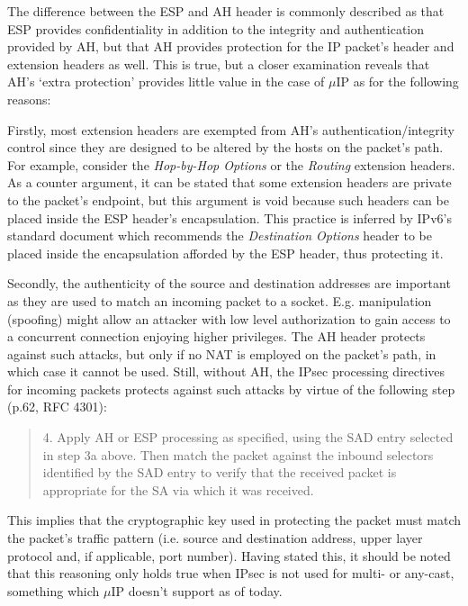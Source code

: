 \documentclass[final,a4paper,twoside,11pt,onecolumn]{report}
\begin{document}
The difference between the ESP and AH header is commonly described as that ESP provides confidentiality in addition to the integrity and authentication provided by AH, but that AH provides protection for the IP packet's header and extension headers as well. This is true, but a closer examination reveals that AH's `extra protection' provides little value in the case of $\mu$IP as for the following reasons:

Firstly, most extension headers are exempted from AH's authentication/integrity control since they are designed to be altered by the hosts on the packet's path. For example, consider the \emph{Hop-by-Hop Options} or the \emph{Routing} extension headers. As a counter argument, it can be stated that some extension headers are private to the packet's endpoint, but this argument is void because such headers can be placed inside the ESP header's encapsulation. This practice is inferred by IPv6's standard document\citep[p.13]{rfc2460} which recommends the \emph{Destination Options} header to be placed inside the encapsulation afforded by the ESP header, thus protecting it.

Secondly, the authenticity of the source and destination addresses are important as they are used to match an incoming packet to a socket. E.g. manipulation (spoofing) might allow an attacker with low level authorization to gain access to a concurrent connection enjoying higher privileges. The AH header protects against such attacks, but only if no NAT is employed on the packet's path, in which case it cannot be used. Still, without AH, the IPsec processing directives for incoming packets protects against such attacks by virtue of the following step (p.62, RFC 4301):


\begin{quotation}
4.  Apply AH or ESP processing as specified, using the SAD entry
    selected in step 3a above. Then match the packet against the
    inbound selectors identified by the SAD entry to verify that the
    received packet is appropriate for the SA via which it was
    received.
\end{quotation}

This implies that the cryptographic key used in protecting the packet must match the packet's traffic pattern (i.e. source and destination address, upper layer protocol and, if applicable, port number). Having stated this, it should be noted that this reasoning only holds true when IPsec is not used for multi- or any-cast, something which $\mu$IP doesn't support as of today.
\end{document}
